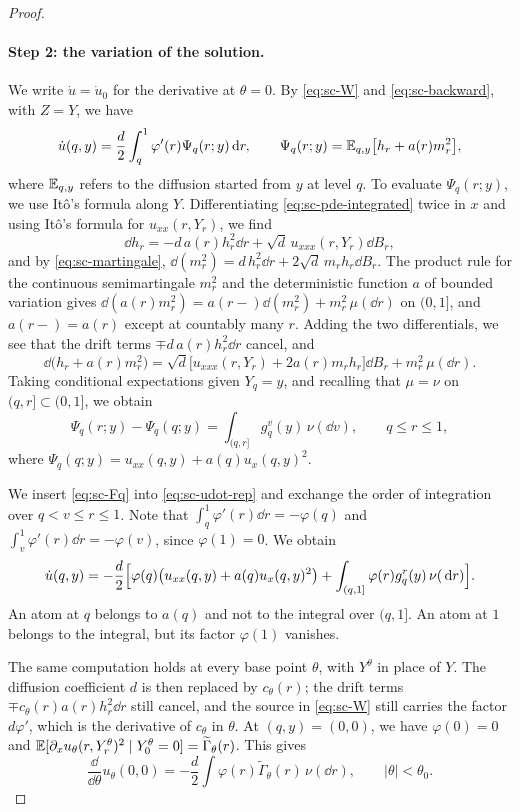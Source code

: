 \begin{proof}
\paragraph{Step 2: the variation of the solution.}
We write $\dot u=\dot u_0$ for the derivative at $\theta=0$. By
\eqref{eq:sc-W} and \eqref{eq:sc-backward}, with $Z=Y$, we have
\begin{equation}\label{eq:sc-udot-rep}
 \dot u(q,y)=\frac d2\int_q^1\varphi'(r)\Psi_q(r;y)\,\mathrm d r,\qquad
 \Psi_q(r;y)=\mathbb E_{q,y}\bigl[h_r+a(r)m_r^2\bigr],
\end{equation}
where $\mathbb E_{q,y}$ refers to the diffusion started from $y$ at level $q$.
To evaluate $\Psi_q(r;y)$, we use Itô's formula along $Y$. Differentiating
\eqref{eq:sc-pde-integrated} twice in $x$ and using Itô's formula for
$u_{xx}(r,Y_r)$, we find
\[
 \dd h_r=-d\,a(r)h_r^2\dd r+\sqrt d\,u_{xxx}(r,Y_r)\dd B_r,
\]
and by \eqref{eq:sc-martingale},
$\dd(m_r^2)=d\,h_r^2\dd r+2\sqrt d\,m_rh_r\dd B_r$. The product rule for
the continuous semimartingale $m_r^2$ and the deterministic function
$a$ of bounded variation gives
$\dd(a(r)m_r^2)=a(r-)\dd(m_r^2)+m_r^2\,\mu(\dd r)$ on $(0,1]$, and
$a(r-)=a(r)$ except at countably many $r$. Adding the two
differentials, we see that the drift terms $\mp d\,a(r)h_r^2\dd r$
cancel, and
\[
 \dd\bigl(h_r+a(r)m_r^2\bigr)
 =\sqrt d\bigl[u_{xxx}(r,Y_r)+2a(r)m_rh_r\bigr]\dd B_r+m_r^2\,\mu(\dd r).
\]
Taking conditional expectations given $Y_q=y$, and recalling that
$\mu=\nu$ on $(q,r]\subset(0,1]$, we obtain
\begin{equation}\label{eq:sc-Fq}
 \Psi_q(r;y)-\Psi_q(q;y)=\int_{(q,r]}g_q^v(y)\,\nu(\dd v),\qquad q\le r\le1,
\end{equation}
where $\Psi_q(q;y)=u_{xx}(q,y)+a(q)u_x(q,y)^2$.

We insert \eqref{eq:sc-Fq} into \eqref{eq:sc-udot-rep} and exchange the
order of integration over $q<v\le r\le1$. Note that
$\int_q^1\varphi'(r)\dd r=-\varphi(q)$ and
$\int_v^1\varphi'(r)\dd r=-\varphi(v)$, since $\varphi(1)=0$. We obtain
\begin{equation}\label{eq:scalarNodeVariation}
 \dot u(q,y)=-\frac d2\Bigl[
  \varphi(q)\bigl(u_{xx}(q,y)+a(q)u_x(q,y)^2\bigr)
  +\int_{(q,1]}\varphi(r)g_q^r(y)\,\nu(\,\mathrm d r)\Bigr].
\end{equation}
An atom at $q$ belongs to $a(q)$ and not to the integral over $(q,1]$.
An atom at $1$ belongs to the integral, but its factor $\varphi(1)$
vanishes.

The same computation holds at every base point $\theta$, with $Y^\theta$
in place of $Y$. The diffusion coefficient $d$ is then replaced by
$c_\theta(r)$; the drift terms $\mp c_\theta(r)a(r)h_r^2\dd r$ still
cancel, and the source in \eqref{eq:sc-W} still carries the factor
$d\varphi'$, which is the derivative of $c_\theta$ in $\theta$. At
$(q,y)=(0,0)$, we have $\varphi(0)=0$ and
$\mathbb E[\partial_xu_\theta(r,Y^\theta_r)^2\mid Y^\theta_0=0]
=\widetilde\Gamma_\theta(r)$. This gives
\begin{equation}\label{eq:sc-root-variation}
 \frac{\dd}{\dd\theta}u_\theta(0,0)
 =-\frac d2\int\varphi(r)\widetilde\Gamma_\theta(r)\,\nu(\dd r),
 \qquad|\theta|<\theta_0 .
\end{equation}


\end{proof}
